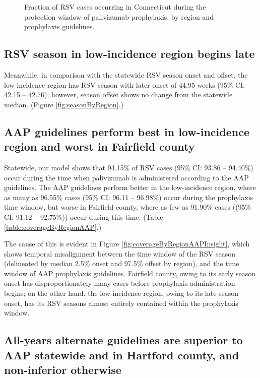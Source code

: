 \documentclass{article}\usepackage[]{graphicx}\usepackage[]{color}
\newenvironment{knitrout}{}{} %
\begin{document}
\begin{multicols}{2}
\begin{figure*}[t]
\begin{knitrout}
\end{knitrout}

\caption{Fraction of RSV cases occurring in Connecticut during the protection window of palivizumab prophylaxis, by region and prophylaxis guidelines.}
\label{fig:coverageByRegion}
\end{figure*}

\subsection{RSV season in low-incidence region begins late}

Meanwhile, in comparison with the statewide RSV season onset and offset, the low-incidence region has RSV season with later onset of 44.95 weeks (95\% CI: 42.15 -- 42.76); however, season offset shows no change from the statewide median. (Figure \ref{fig:seasonByRegion}.)

\subsection{AAP guidelines perform best in low-incidence region and worst in Fairfield county}

Statewide, our model shows that 94.15\% of RSV cases (95\% CI: 93.86 -- 94.40\%) occur during the time when palivizumab is administered according to the AAP guidelines. The AAP guidelines perform better in the low-incidence region, where as many as 96.55\% cases (95\% CI: 96.11 -- 96.98\%) occur during the prophylaxis time window, but worse in Fairfield county, where as few as 91.90\% cases ((95\% CI: 91.12 -- 92.75\%)) occur during this time. (Table \ref{table:coverageByRegionAAP}.)

The cause of this is evident in Figure \ref{fig:coverageByRegionAAPInsight}, which shows temporal misalignment between the time window of the RSV season (delineated by median 2.5\% onset and 97.5\% offset by region), and the time window of AAP prophylaxis guidelines. Fairfield county, owing to its early season onset has disproportionately many cases before prophylaxis administration begins; on the other hand, the low-incidence region, owing to its late season onset, has its RSV seasons almost entirely contained within the prophylaxis window.

\subsection{All-years alternate guidelines are superior to AAP statewide and in Hartford county, and non-inferior otherwise}


\end{multicols}
\end{document}

